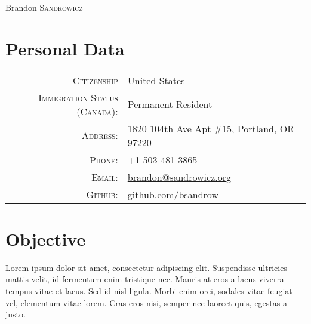 \documentclass[a4paper,10pt]{article}
\begin{document}
\pagestyle{empty} %

\par{\centering
    {\Huge Brandon \textsc{Sandrowicz} }
    \bigskip\par}

\section{Personal Data}
\begin{tabular}{rl}
\textsc{Citizenship}                    & United States\\
\textsc{Immigration Status (Canada):}   & Permanent Resident\\
\textsc{Address:}                       & 1820 104th Ave Apt \#15, Portland, OR 97220\\
\textsc{Phone:}                         & +1 503 481 3865\\
\textsc{Email:}                         & \href{mailto:brandon@sandrowicz.org}{brandon@sandrowicz.org}\\
\textsc{Github:}                        & \href{http://github.com/bsandrow}{github.com/bsandrow}\\
\end{tabular}

\section{Objective}
Lorem ipsum dolor sit amet, consectetur adipiscing elit. Suspendisse ultricies
mattis velit, id fermentum enim tristique nec. Mauris at eros a lacus viverra
tempus vitae et lacus. Sed id nisl ligula. Morbi enim orci, sodales vitae
feugiat vel, elementum vitae lorem. Cras eros nisi, semper nec laoreet quis,
egestas a justo.

\end{document}
